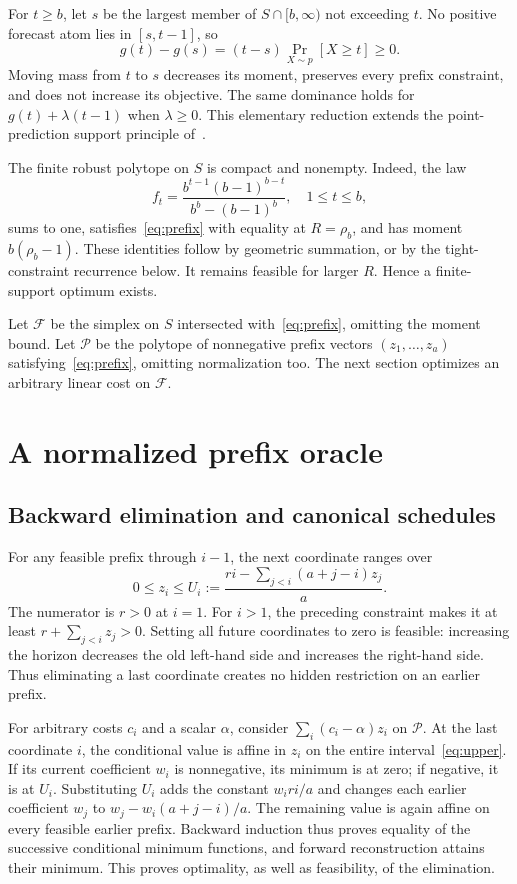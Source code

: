 \documentclass[manuscript,11pt,screen,nonacm]{acmart}
\newcommand{\Q}{\mathcal F}
\newcommand{\Pp}{\mathcal P}
\begin{document}
For $t\ge b$, let $s$ be the largest member of $S\cap[b,\infty)$ not
exceeding $t$. No positive forecast atom lies in $[s,t-1]$, so
\begin{equation}\label{eq:dominance}
 g(t)-g(s)=(t-s)\Pr_{X\sim p}[X\ge t]\ge0.
\end{equation}
Moving mass from $t$ to $s$ decreases its moment, preserves every prefix
constraint, and does not increase its objective. The same dominance holds
for $g(t)+\lambda(t-1)$ when $\lambda\ge0$.
This elementary reduction extends the point-prediction support principle
of~\cite[Appendix E.1, arXiv v1]{li2025predictionspecificdesignlearningaugmentedalgorithms}.

The finite robust polytope on $S$ is compact and nonempty. Indeed, the law
\[
 f_t=\frac{b^{t-1}(b-1)^{b-t}}{b^b-(b-1)^b},\quad 1\le t\le b,
\]
sums to one, satisfies~\eqref{eq:prefix} with equality at $R=\rho_b$,
and has moment $b(\rho_b-1)$. These identities follow by geometric summation,
or by the tight-constraint recurrence below. It remains feasible for larger
$R$. Hence a finite-support optimum exists.

Let $\Q$ be the simplex on $S$ intersected with~\eqref{eq:prefix}, omitting
the moment bound. Let $\Pp$ be the polytope of nonnegative prefix vectors
$(z_1,\ldots,z_a)$ satisfying~\eqref{eq:prefix}, omitting normalization too.
The next section optimizes an arbitrary linear cost on $\Q$.

\section{A normalized prefix oracle}\label{sec:oracle}
\subsection{Backward elimination and canonical schedules}
For any feasible prefix through $i-1$, the next coordinate ranges over
\begin{equation}\label{eq:upper}
 0\le z_i\le U_i:=\frac{ri-\sum_{j<i}(a+j-i)z_j}{a}.
\end{equation}
The numerator is $r>0$ at $i=1$. For $i>1$, the preceding constraint makes
it at least $r+\sum_{j<i}z_j>0$. Setting all future coordinates to zero is
feasible: increasing the horizon decreases the old left-hand side and
increases the right-hand side. Thus eliminating a last coordinate creates
no hidden restriction on an earlier prefix.

For arbitrary costs $c_i$ and a scalar $\alpha$, consider
$\sum_i(c_i-\alpha)z_i$ on $\Pp$. At the last coordinate $i$, the
conditional value is affine in $z_i$ on the entire interval~\eqref{eq:upper}.
If its current coefficient $w_i$ is nonnegative, its minimum is at zero;
if negative, it is at $U_i$. Substituting $U_i$ adds the constant
$w_i ri/a$ and changes each earlier coefficient $w_j$ to
$w_j-w_i(a+j-i)/a$. The remaining value is again affine on every feasible
earlier prefix. Backward induction thus proves equality of the successive
conditional minimum functions, and forward reconstruction attains their
minimum. This proves optimality, as well as feasibility, of the elimination.
\end{document}
